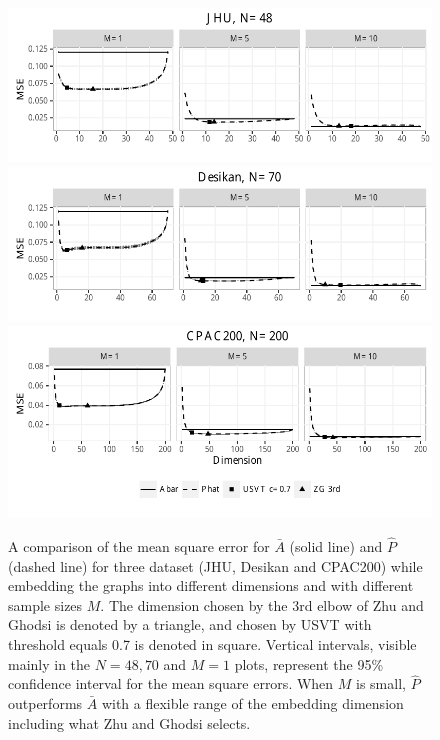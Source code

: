 \documentclass[a4paper]{article}
\begin{document}
\begin{figure}[!htb]
\centering
\includegraphics[width=1\textwidth]{corr_data_MSE_jhu.pdf}\\
\includegraphics[width=1\textwidth]{corr_data_MSE_desikan.pdf}\\
\includegraphics[width=1\textwidth]{corr_data_MSE_CPAC200.pdf}
\caption{A comparison of the mean square error for $\bar{A}$ (solid line) and $\hat{P}$ (dashed line) for three dataset (JHU, Desikan and CPAC200) while embedding the graphs into different dimensions and with different sample sizes $M$. The dimension chosen by the 3rd elbow of Zhu and Ghodsi is denoted by a triangle,
 and chosen by USVT with threshold equals 0.7 is denoted in square.
 Vertical intervals, visible mainly in the $N=48,70$ and $M=1$ plots, represent the 95\% confidence interval for the mean square errors.  When $M$ is small, $\hat{P}$ outperforms $\bar{A}$ with a flexible range of the embedding dimension including what Zhu and Ghodsi selects.}
\label{fig:realdata}
\end{figure}
\end{document}
